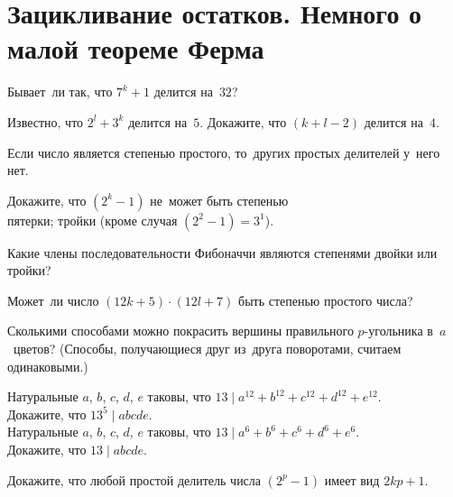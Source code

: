 

\section*{Зацикливание остатков. Немного о малой теореме Ферма}


\begin{problems}

Бывает~ли так, что $7^k + 1$ делится на~$32$?

\item
Известно, что $2^l + 3^k$ делится на~$5$.
Докажите, что $(k + l - 2)$ делится на~$4$.

\end{problems}

Если число является степенью простого, то~других простых делителей у~него нет.

\begin{problems}

\item
Докажите, что $(2^k - 1)$ не~может быть степенью
\\
\subproblem пятерки;
\quad
\subproblem тройки (кроме случая $(2^2 - 1) = 3^1$).

\item
Какие члены последовательности Фибоначчи являются степенями двойки или тройки?

\item
Может~ли число $(12 k + 5) \cdot (12 l + 7)$ быть степенью простого числа?

\item{}
Сколькими способами можно покрасить вершины правильного $p$-угольника
в~$a$~цветов?
(Способы, получающиеся друг из~друга поворотами, считаем одинаковыми.)

\item
\subproblem
Натуральные $a$, $b$, $c$, $d$, $e$ таковы, что
\(
    13 \mid a^{12} + b^{12} + c^{12} + d^{12} + e^{12}
\).\\
Докажите, что $13^5 \mid a b c d e$.
\\
\subproblem
Натуральные $a$, $b$, $c$, $d$, $e$ таковы, что
\(
    13 \mid a^{6} + b^{6} + c^{6} + d^{6} + e^{6}
\).\\
Докажите, что $13 \mid a b c d e$.

\item
Докажите, что любой простой делитель числа $(2^p - 1)$ имеет вид $2 k p + 1$.

\end{problems}

